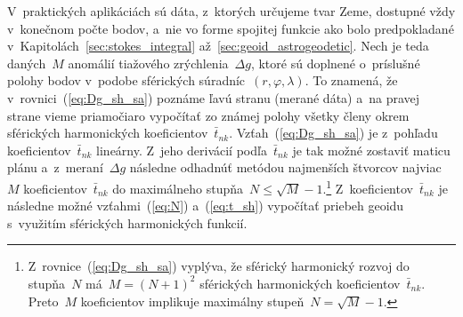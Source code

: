 \documentclass[a4paper,12pt]{book}
\begin{document}
V~praktických aplikáciách sú dáta, z~ktorých určujeme tvar Zeme, dostupné vždy 
v~konečnom počte bodov, a~nie vo forme spojitej funkcie ako bolo predpokladané 
v~Kapitolách~\ref{sec:stokes_integral} až~\ref{sec:geoid_astrogeodetic}.  Nech 
je teda daných~$M$ anomálií tiažového zrýchlenia~$\Delta g$, ktoré sú doplnené 
o~príslušné polohy bodov v~podobe sférických súradníc~$(r, \varphi, \lambda)$.  
To znamená, že v~rovnici~(\ref{eq:Dg_sh_sa}) poznáme ľavú stranu (merané dáta) 
a~na pravej strane vieme priamočiaro vypočítať zo známej polohy všetky členy 
okrem sférických harmonických koeficientov~$\bar{t}_{nk}$.  
Vzťah~(\ref{eq:Dg_sh_sa}) je z~pohľadu koeficientov~$\bar{t}_{nk}$ lineárny.  
Z~jeho derivácií podľa~$\bar{t}_{nk}$ je tak možné zostaviť maticu plánu 
a~z~meraní~$\Delta g$ následne odhadnúť metódou najmenších štvorcov najviac~$M$ 
koeficientov~$\bar{t}_{nk}$ do maximálneho stupňa~$N \leq \sqrt{M} 
- 1$.\footnote{Z~rovnice~(\ref{eq:Dg_sh_sa}) vyplýva, že sférický harmonický 
rozvoj do stupňa~$N$ má~$M = (N + 1)^2$ sférických harmonických 
koeficientov~$\bar{t}_{nk}$.  Preto~$M$ koeficientov implikuje maximálny 
stupeň~$N = \sqrt{M} - 1$.}  Z~koeficientov~$\bar{t}_{nk}$ je následne možné 
vzťahmi~(\ref{eq:N}) a~(\ref{eq:t_sh}) vypočítať priebeh geoidu s~využitím 
sférických harmonických funkcií.
\end{document}
